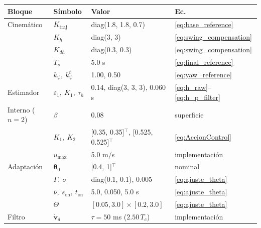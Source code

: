 \begin{tabular}{llll}
\toprule
Bloque & S\'imbolo & Valor & Ec. \\
\midrule
Cinem\'atico & $K_{\mathrm{traj}}$ & diag(1.8, 1.8, 0.7) & \eqref{eq:base_reference} \\
 & $K_h$ & diag(3, 3) & \eqref{eq:swing_compensation} \\
 & $K_{dh}$ & diag(0.3, 0.3) & \eqref{eq:swing_compensation} \\
 & $T_s$ & 5.0 s & \eqref{eq:final_reference} \\
 & $k_\psi,\ k_\psi^t$ & 1.00, 0.50 & \eqref{eq:yaw_reference} \\
Estimador & $\varepsilon_1,\ K_1,\ \tau_h$ & 0.14, diag(3, 3, 3), 0.060 s & \eqref{eq:h_raw}--\eqref{eq:h_p_filter} \\
Interno ($n=2$) & $\beta$ & 0.08 & superficie \\
 & $K_1,\ K_2$ & [0.35, 0.35]$^\top$, [0.525, 0.525]$^\top$ & \eqref{eq:AccionControl} \\
 & $u_{\max}$ & 5.0 m/s & implementaci\'on \\
Adaptaci\'on & $\boldsymbol{\theta}_0$ & [0.4, 1]$^\top$ & nominal \\
 & $\Gamma,\ \sigma$ & diag(0.1, 0.1), 0.005 & \eqref{eq:ajuste_theta} \\
 & $\bar\nu,\ s_{\mathrm{on}},\ t_{\mathrm{on}}$ & 5.0, 0.050, 5.0 s & \eqref{eq:ajuste_theta} \\
 & $\Theta$ & $[0.05,3.0]\times[0.2,3.0]$ & \eqref{eq:ajuste_theta} \\
Filtro & $\dot{\mathbf{v}}_d$ & $\tau = 50$ ms ($2.50\,T_c$) & implementaci\'on \\
\bottomrule
\end{tabular}
